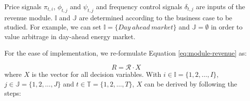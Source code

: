 Price signals $\pi_{t,i}$, $\phi_{t,j}$ and $\psi_{t,j}$ and frequency control signals $\delta_{t,j}$ are inputs of the revenue module. $\mathbb{I}$ and $\mathbb{J}$ are determined according to the business case to be studied. For example, we can set $\mathbb{I} = \{Day~ahead~market\}$ and $ \mathbb{J}=\emptyset$ in order to value arbitrage in day-ahead energy market. 





For the ease of implementation, we re-formulate Equation \eqref{eq:module-revenue} as:

\begin{equation}
\label{eq:revnue-matrix}
R = \mathcal{R} \cdot X 
\end{equation}
where $X$ is the vector for all decision variables. %
With $i \in \mathbb{I} = \{1,2,\dots,I\}$,
$j \in \mathbb{J} = \{1,2,\dots,J\}$ and
$t \in \mathbb{T} = \{1,2,\dots,T\}$, $X$ can be derived by following the steps:

